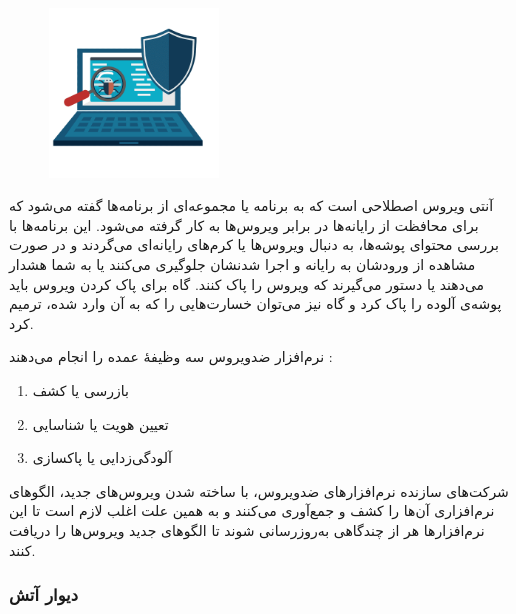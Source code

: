 \documentclass[12pt]{book}
\begin{document}
\begin{figure}
  \vspace{-20pt}
  \begin{center}
    \includegraphics[width=0.4\textwidth]{./security-computer-wormhole-blue-computer-network-computer_3.png}
  \end{center}
  \vspace{-20pt}
  \caption{}
  \vspace{-10pt}
\end{figure}

 آنتی ویروس اصطلاحی است که به برنامه یا مجموعه‌ای از برنامه‌ها گفته می‌شود که برای محافظت از رایانه‌ها در برابر ویروس‌‌ها به کار گرفته می‌شود. این برنامه‌ها با بررسی محتوای پوشه‌ها، به دنبال ویروس‌ها یا کرم‌های رایانه‌ای می‌گردند و در صورت مشاهده از ورودشان به رایانه و اجرا شدنشان جلوگیری می‌کنند یا به شما هشدار می‌دهند یا دستور می‌گیرند که ویروس را پاک کنند. گاه برای پاک کردن ویروس باید پوشه‌ی آلوده را پاک کرد و گاه نیز می‌توان خسارت‌هایی را که به آن وارد شده، ترمیم کرد. 
 
 
 نرم‌افزار ضدویروس سه وظیفهٔ عمده را انجام می‌دهند : 
 \begin{enumerate}
 	\item بازرسی یا کشف
 	\item تعیین هویت یا شناسایی
 	\item آلودگی‌زدایی یا پاکسازی
 \end{enumerate}
  شرکت‌های سازنده نرم‌افزارهای ضدویروس، با ساخته شدن ویروس‌های جدید، الگوهای نرم‌افزاری آن‌ها را کشف و جمع‌آوری می‌کنند و به همین علت اغلب لازم است تا این نرم‌افزارها هر از چندگاهی به‌روزرسانی 
   شوند تا الگوهای جدید ویروس‌ها را دریافت کنند. 




\subsubsection{
دیوار آتش
}
\end{document}
